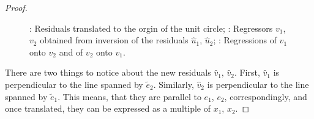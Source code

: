 \begin{proof}
\begin{figure}[ht!]
\begin{center}
\caption{: Residuals translated to the orgin of the unit circle;
: Regressors $v_1$, $v_2$ obtained from inversion of the residuals $\hat{u}_1$, $\hat{u}_2$;
: Regressions of $v_1$ onto $v_2$ and of $v_2$ onto $v_1$.}
\end{center}
\end{figure}

There are two things to notice about the new residuals $\hat{v}_1$, $\hat{v}_2$.
First, $\hat{v}_1$ is perpendicular to the line spanned by $\tilde{e}_2$.
Similarly, $\hat{v}_2$ is perpendicular to the line spanned by $\tilde{e}_1$.
This means, that they are parallel to $e_1$, $e_2$, correspondingly,
and once translated, they can be expressed as a multiple of $x_1$, $x_2$.


\end{proof}
